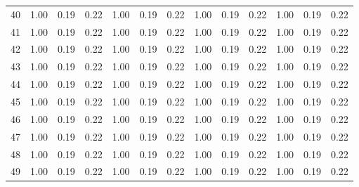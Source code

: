 \begin{landscape}
\begin{center}
\begin{longtable}{|c|c|c|c|c|c|c|c|c|c|c|c|c|}
40 & 1.00 & 0.19 & 0.22 & 1.00 & 0.19 & 0.22 & 1.00 & 0.19 & 0.22 & 1.00 & 0.19 & 0.22 \\
41 & 1.00 & 0.19 & 0.22 & 1.00 & 0.19 & 0.22 & 1.00 & 0.19 & 0.22 & 1.00 & 0.19 & 0.22 \\
42 & 1.00 & 0.19 & 0.22 & 1.00 & 0.19 & 0.22 & 1.00 & 0.19 & 0.22 & 1.00 & 0.19 & 0.22 \\
43 & 1.00 & 0.19 & 0.22 & 1.00 & 0.19 & 0.22 & 1.00 & 0.19 & 0.22 & 1.00 & 0.19 & 0.22 \\
44 & 1.00 & 0.19 & 0.22 & 1.00 & 0.19 & 0.22 & 1.00 & 0.19 & 0.22 & 1.00 & 0.19 & 0.22 \\
45 & 1.00 & 0.19 & 0.22 & 1.00 & 0.19 & 0.22 & 1.00 & 0.19 & 0.22 & 1.00 & 0.19 & 0.22 \\
46 & 1.00 & 0.19 & 0.22 & 1.00 & 0.19 & 0.22 & 1.00 & 0.19 & 0.22 & 1.00 & 0.19 & 0.22 \\
47 & 1.00 & 0.19 & 0.22 & 1.00 & 0.19 & 0.22 & 1.00 & 0.19 & 0.22 & 1.00 & 0.19 & 0.22 \\
48 & 1.00 & 0.19 & 0.22 & 1.00 & 0.19 & 0.22 & 1.00 & 0.19 & 0.22 & 1.00 & 0.19 & 0.22 \\
49 & 1.00 & 0.19 & 0.22 & 1.00 & 0.19 & 0.22 & 1.00 & 0.19 & 0.22 & 1.00 & 0.19 & 0.22 \\
\end{longtable}
\end{center}
\end{landscape}

\renewcommand{\arraystretch}{1.0}
